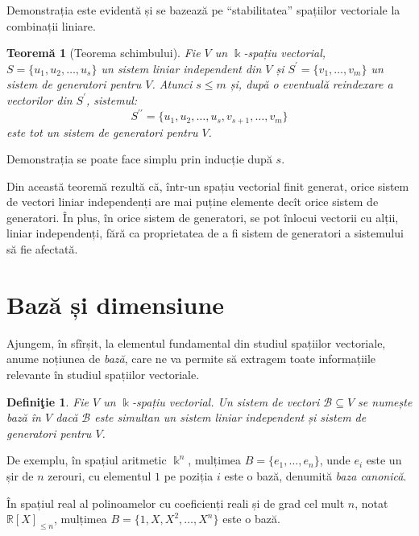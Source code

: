 \documentclass[11pt,a4paper]{article}
\newcommand\seq{\subseteq}
\theoremstyle{dotless}
\newtheorem{theorem}{Teorem\u{a}}[section]
\theoremstyle{dotlessdr}
\newtheorem{definition}{Defini\c{t}ie}[section]
\begin{document}
Demonstrația este evidentă și se bazează pe \enquote{stabilitatea} spațiilor 
vectoriale la combinații liniare.

\begin{theorem}[Teorema schimbului]
Fie $V$ un $\Bbbk$-spațiu vectorial, $S = \{u_1, u_2, \dots, u_s\}$ un sistem 
liniar independent din $V$ și $S^{\prime} = \{v_1, \dots, v_m\}$ un sistem de 
generatori pentru $V$. Atunci $s \leq m$ și, după o eventuală reindexare a 
vectorilor din $S^{\prime}$, sistemul: 
\[
S^{\prime\prime} = \{u_1, u_2, \dots, u_s, v_{s+1}, \dots, v_m\}
\]
este tot un sistem de generatori pentru $V$.
\end{theorem}

Demonstrația se poate face simplu prin inducție după $s$.

Din această teoremă rezultă că, într-un spațiu vectorial finit generat, orice 
sistem de vectori liniar independenți are mai puține elemente decît orice 
sistem de generatori. În plus, în orice sistem de generatori, se pot înlocui 
vectorii cu alții, liniar independenți, fără ca proprietatea de a fi sistem de 
generatori a sistemului să fie afectată.


\section{Bază și dimensiune}

\indent\indent Ajungem, în sfîrșit, la elementul fundamental din studiul 
spațiilor vectoriale, anume noțiunea de \emph{bază}, care ne va permite să 
extragem toate informațiile relevante în studiul spațiilor vectoriale.

\begin{definition}
Fie $V$ un $\Bbbk$-spațiu vectorial. Un sistem de vectori $\mathcal{B} \seq V$ 
se numește \emph{bază} în $V$ dacă $\mathcal{B}$ este simultan un sistem liniar 
independent și sistem de generatori pentru $V$.
\end{definition}

De exemplu, în spațiul aritmetic $\Bbbk^n$, mulțimea $B = \{e_1, \dots, e_n\}$, 
unde $e_i$ este un șir de $n$ zerouri, cu elementul $1$ pe poziția $i$ este o 
bază, denumită \emph{baza canonică}.

În spațiul real al polinoamelor cu coeficienți reali și de grad cel mult $n$, 
notat $\mathbb{R}[X]_{\leq n}$, mulțimea $B = \{1, X, X^2, \dots, X^n\}$ este 
o bază.
\end{document}
